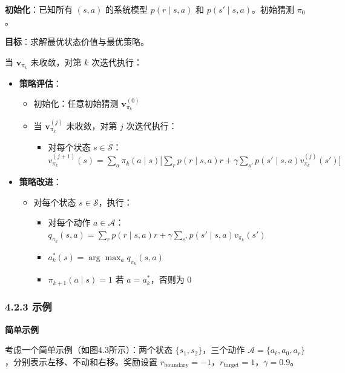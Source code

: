 \documentclass[UTF8]{article}
\begin{document}
\begin{algobox}[4.2 策略迭代算法]
\textbf{初始化}：已知所有 $(s,a)$ 的系统模型 $p(r \mid s,a)$ 和 $p(s' \mid s,a)$。初始猜测 $\pi_0$。

\textbf{目标}：求解最优状态价值与最优策略。

当 $\boldsymbol{v}_{\pi_k}$ 未收敛，对第 $k$ 次迭代执行：
\begin{itemize}
    \item \textbf{策略评估}：
    \begin{itemize}
        \item 初始化：任意初始猜测 $\boldsymbol{v}_{\pi_k}^{(0)}$
        \item 当 $\boldsymbol{v}_{\pi_k}^{(j)}$ 未收敛，对第 $j$ 次迭代执行：
        \begin{itemize}
            \item 对每个状态 $s \in \mathcal{S}$：
            \quad $v_{\pi_k}^{(j+1)}(s) = \sum_{a} \pi_k(a \mid s) \bigl[ \sum_{r} p(r \mid s,a) r + \gamma \sum_{s'} p(s' \mid s,a) v_{\pi_k}^{(j)}(s') \bigr]$
        \end{itemize}
    \end{itemize}
    \item \textbf{策略改进}：
    \begin{itemize}
        \item 对每个状态 $s \in \mathcal{S}$，执行：
        \begin{itemize}
            \item 对每个动作 $a \in \mathcal{A}$：
            \quad $q_{\pi_k}(s,a) = \sum_{r} p(r \mid s,a) r + \gamma \sum_{s'} p(s' \mid s,a) v_{\pi_k}(s')$
            \item $a_k^*(s) = \arg\max_a q_{\pi_k}(s,a)$
            \item $\pi_{k+1}(a \mid s) = 1$ 若 $a = a_k^*$，否则为 $0$
        \end{itemize}
    \end{itemize}
\end{itemize}
\end{algobox}

\subsubsection*{4.2.3 示例}

\textbf{简单示例}

考虑一个简单示例（如图4.3所示）：两个状态 $\{s_1, s_2\}$，三个动作 $\mathcal{A} = \{a_\ell, a_0, a_r\}$，分别表示左移、不动和右移。奖励设置 $r_{\text{boundary}} = -1$，$r_{\text{target}} = 1$，$\gamma = 0.9$。
\end{document}
